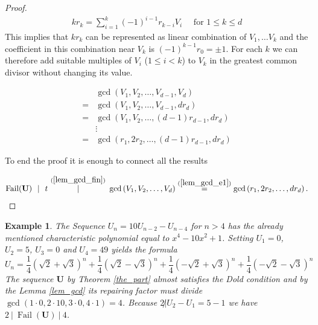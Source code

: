 \documentclass[preprint,12pt]{elsarticle}
\DeclareMathOperator{\fail}{Fail}
\newtheorem{example}{Example}
\begin{document}
\begin{proof}
\begin{align}
    kr_k = \sum_{i=1}^k(-1)^{i-1}r_{k-i}{V}_i 
    \quad\text{ for $1 \leqslant k \leqslant d$}
\end{align}
This implies that $kr_k$ can be represented as linear combination of ${V}_1 , \ldots {V}_k$ and the coefficient in this combination near ${V}_k$ is $(-1)^{k-1}r_0 = \pm 1$. For each $k$ we can therefore add suitable multiples of ${V}_i$ ($1\leqslant i<k$) to ${V}_k$ in the greatest common divisor without changing its value.

\begin{equation}
    \begin{split}\label{lem_gcd_e1}
    &\gcd\left({V}_1, {V}_2, \ldots,  {V}_{d-1}, {V}_d \right) \\
    =&\gcd\left({V}_1, {V}_2, \ldots,  {V}_{d-1}, dr_d \right) \\
    =&\gcd\left({V}_1, {V}_2, \ldots,  (d-1)r_{d-1}, dr_d \right) \\
    &\vdots \\
    =&\gcd\left(r_1,2r_2, \ldots,  (d-1)r_{d-1}, dr_d \right) %
\end{split}  
\end{equation}


To end the proof it is enough to connect all the results

\begin{align}
    \fail(\mathbf{U}) \ \  |\ \ 
    t \ \overset{(\ref{lem_gcd_fin})}{|} \ 
    \gcd\left({V}_1, {V}_2, \ldots, {V}_d \right) \overset{(\ref{lem_gcd_e1})}{=}
    \gcd\left(r_1,2r_2, \ldots, dr_d \right).
\end{align}
\end{proof}


\begin{example}
    The Sequence ${U}_{n} = 10{U}_{n-2} - {U}_{n-4}$  for $n>4$ has the already mentioned characteristic polynomial equal to $x^4-10x^2+1$. 
    Setting ${U}_1 = 0$, ${U}_2=5$, ${U}_3=0$ and ${U}_4=49$ yields the formula 
    $$
    {U}_n = 
        \frac{1}{4}\left(\sqrt{2}+\sqrt{3}\right)^n
        +\frac{1}{4}\left(\sqrt{2}-\sqrt{3}\right)^n
        +\frac{1}{4}\left(-\sqrt{2}+\sqrt{3}\right)^n
        +\frac{1}{4}\left(-\sqrt{2}-\sqrt{3}\right)^n
    $$
    The sequence $\mathbf{U}$ by Theorem \ref{the_part} almost satisfies the Dold condition and by the Lemma \ref{lem_gcd} its repairing factor must divide $\gcd(1\cdot0,2\cdot 10, 3\cdot0, 4\cdot1) = 4$. Because $2\not|{U}_2 - {U}_1 = 5-1$ we have $2\ |\ \fail(\mathbf{U})\ |\ 4$.

\end{example}
\end{document}
